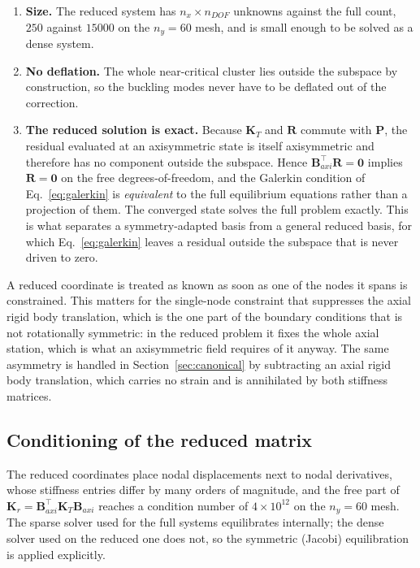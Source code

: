 \documentclass[11pt,a4paper]{article}
\begin{document}
\begin{enumerate}\itemsep3pt
  \item \textbf{Size.}  The reduced system has $n_x \times n_{DOF}$ unknowns
        against the full count, $250$ against $15000$ on the $n_y = 60$
        mesh, and is small enough to be solved as a dense system.
  \item \textbf{No deflation.}  The whole near-critical cluster lies outside
        the subspace by construction, so the buckling modes never have to be
        deflated out of the correction.
  \item \textbf{The reduced solution is exact.}  Because $\boldsymbol{K}_T$
        and $\boldsymbol{R}$ commute with $\boldsymbol{P}$, the residual
        evaluated at an axisymmetric state is itself axisymmetric and
        therefore has no component outside the subspace.  Hence
        $\boldsymbol{B}_{axi}^\top\boldsymbol{R} = \boldsymbol{0}$ implies
        $\boldsymbol{R} = \boldsymbol{0}$ on the free degrees-of-freedom, and
        the Galerkin condition of Eq.~\ref{eq:galerkin} is \emph{equivalent}
        to the full equilibrium equations rather than a projection of them.
        The converged state solves the full problem exactly.  This is what
        separates a symmetry-adapted basis from a general reduced basis, for
        which Eq.~\ref{eq:galerkin} leaves a residual outside the subspace
        that is never driven to zero.
\end{enumerate}

A reduced coordinate is treated as known as soon as one of the nodes it spans
is constrained.  This matters for the single-node constraint that suppresses
the axial rigid body translation, which is the one part of the boundary
conditions that is not rotationally symmetric: in the reduced problem it fixes
the whole axial station, which is what an axisymmetric field requires of it
anyway.  The same asymmetry is handled in Section~\ref{sec:canonical} by
subtracting an axial rigid body translation, which carries no strain and is
annihilated by both stiffness matrices.

\subsection{Conditioning of the reduced matrix}
\label{sec:scaling}

The reduced coordinates place nodal displacements next to nodal derivatives,
whose stiffness entries differ by many orders of magnitude, and the free part
of $\boldsymbol{K}_r = \boldsymbol{B}_{axi}^\top \boldsymbol{K}_T
\boldsymbol{B}_{axi}$ reaches a condition number of $4\times10^{12}$ on the
$n_y = 60$ mesh.  The sparse solver used for the full systems equilibrates
internally; the dense solver used on the reduced one does not, so the
symmetric (Jacobi) equilibration is applied explicitly.
\end{document}
